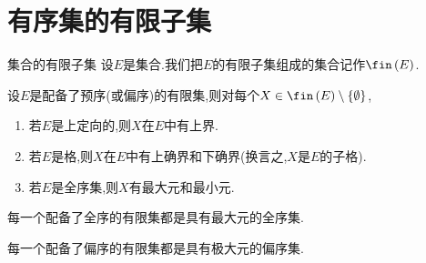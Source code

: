 \section{有序集的有限子集}

\begin{definition}{集合的有限子集}{}
	设$E$是集合.我们把$E$的有限子集组成的集合记作$\fin\left(E\right)$.
\end{definition}

\begin{proposition}{}{}
	设$E$是配备了预序(或偏序)的有限集,则对每个$X\in\fin\left(E\right)\setminus\left\{\emptyset\right\}$,
	\begin{enumerate}
		\item 若$E$是上定向的,则$X$在$E$中有上界.
		\item 若$E$是格,则$X$在$E$中有上确界和下确界(换言之,$X$是$E$的子格).
		\item 若$E$是全序集,则$X$有最大元和最小元.
	\end{enumerate}
\end{proposition}

\begin{corollary}{}{}
	每一个配备了全序的有限集都是具有最大元的全序集.
\end{corollary}

\begin{corollary}{}{}
	每一个配备了偏序的有限集都是具有极大元的偏序集.
\end{corollary}